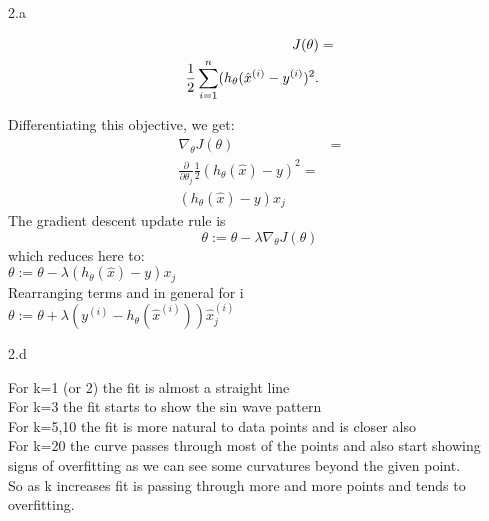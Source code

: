 \LARGE
2.a
\normalsize

\begin{answer}
  \begin{align*}
      J(\theta)&=\\
\frac{1}{2} \sum_{i=1}^{{n}} (h_\theta(\hat{x}^{(i)} - y^{(i)})^2.      
  \end{align*}

  Differentiating this objective, we get:
  \begin{align*}
      \nabla_{\theta} J(\theta)&=\\
      \frac{\partial}{\partial \theta_{j}}\frac{1}{2}  (h_\theta(\hat{x}) - y)^2 = \\
      (h_\theta(\hat{x}) - y)x_{j}
  \end{align*}
  The gradient descent update rule is
  \begin{equation*}
  \theta := \theta - \lambda \nabla_{\theta} J(\theta)
  \end{equation*}
  which reduces here to:
  \\
$  \theta := \theta - \lambda (h_\theta(\hat{x}) - y)x_{j} $
\\ Rearranging terms and in general for i \\
$  \theta := \theta + \lambda (y^{(i)} - h_\theta(\hat{x}^{(i)}))\hat{x}_{j}^{(i)} $
\end{answer}
\clearpage

\LARGE
2.d
\normalsize

\begin{answer}
  \Large
  For k=1 (or 2) the fit is almost a straight line\\
  For k=3 the fit starts to show the sin wave pattern \\
  For k=5,10 the fit is more natural to data points and is closer also\\
  For k=20 the curve passes through most of the points and also start showing signs of overfitting as we can see some curvatures beyond the given point.\\
So as k increases fit is passing through more and more points and tends to overfitting.
  
\end{answer}
\clearpage


